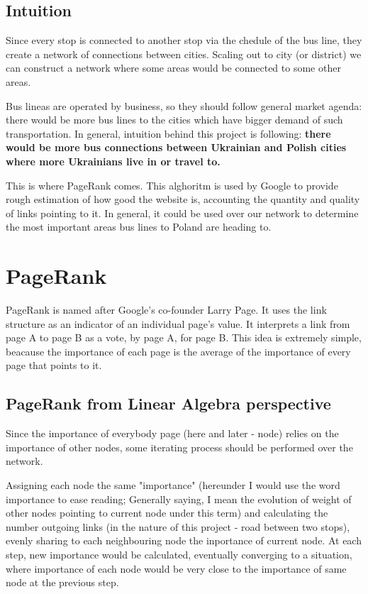 \subsection{Intuition}

Since every stop is connected to another stop via the chedule of the bus line, they create a network of connections between cities. Scaling out to city (or district) we can construct a network where some areas would be connected to some other areas.

Bus lineas are operated by business, so they should follow general market agenda: there would be more bus lines to the cities which have bigger demand of such transportation. In general, intuition behind this project is following: \textbf{there would be more bus connections between Ukrainian and Polish cities where more Ukrainians live in or travel to.}

This is where PageRank comes. This alghoritm is used by Google to provide rough estimation of how good the website is, accounting the quantity and quality of links pointing to it. In general, it could be used over our network to determine the most important areas bus lines to Poland are heading to.

\section{PageRank}

PageRank is named after Google's co-founder Larry Page. It uses the link structure as an indicator of an individual page’s value. It interprets a link from page A to page B as a vote, by page A, for page B. This idea is extremely simple, beacause the importance of each page is the average of the importance of every page that points to it.

\subsection{PageRank from Linear Algebra perspective}

Since the importance of everybody page (here and later - node) relies on the importance of other nodes, some iterating process should be performed over the network.

Assigning each node the same "importance" (hereunder I would use the word importance to ease reading; Generally saying, I mean the evolution of weight of other nodes pointing to current node under this term) and calculating the number outgoing links (in the nature of this project - road between two stops), evenly sharing to each neighbouring node the inportance of current node.  At each step, new importance would be calculated, eventually converging to a situation, where importance of each node would be very close to the importance of same node at the previous step.

